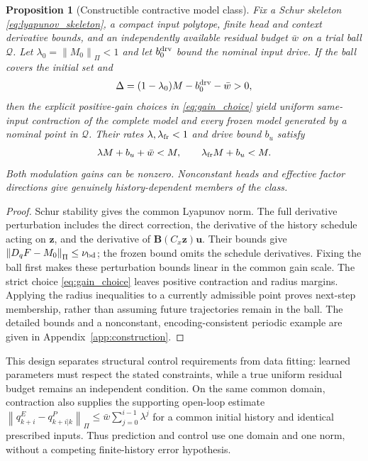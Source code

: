 \documentclass[journal]{IEEEtran}
\newtheorem{proposition}{Proposition}
\newcommand{\vu}{\mathbf{u}}
\newcommand{\vz}{\mathbf{z}}
\newcommand{\mB}{\mathbf{B}}
\newcommand{\norm}[1]{\left\lVert #1\right\rVert}
\begin{document}
\begin{proposition}[Constructible contractive model class]
\label{prop:contractive_class}
Fix a Schur skeleton \eqref{eq:lyapunov_skeleton}, a compact input polytope, finite head and context derivative bounds, and an independently available residual budget $\bar w$ on a trial ball $\mathcal Q$. Let $\lambda_0=\norm{M_0}_\Pi<1$ and let $b_0^{\rm drv}$ bound the nominal input drive. If the ball covers the initial set and
\begin{equation}
\Delta=(1-\lambda_0)M-b_0^{\rm drv}-\bar w>0,
\label{eq:radius_margin}
\end{equation}
then the explicit positive-gain choices in \eqref{eq:gain_choice} yield uniform same-input contraction of the complete model and every frozen model generated by a nominal point in $\mathcal Q$. Their rates $\lambda,\lambda_{\rm fr}<1$ and drive bound $b_u$ satisfy
\begin{equation}
\lambda M+b_u+\bar w<M,\qquad \lambda_{\rm fr}M+b_u<M.
\label{eq:invariant_radius}
\end{equation}
Both modulation gains can be nonzero. Nonconstant heads and effective factor directions give genuinely history-dependent members of the class.
\end{proposition}
\begin{proof}
Schur stability gives the common Lyapunov norm. The full derivative perturbation includes the direct correction, the derivative of the history schedule acting on $\vz$, and the derivative of $\mB(C_x\vz)\vu$. Their bounds give $\norm{D_qF-M_0}_\Pi\le\nu_{\rm bd}$; the frozen bound omits the schedule derivatives. Fixing the ball first makes these perturbation bounds linear in the common gain scale. The strict choice \eqref{eq:gain_choice} leaves positive contraction and radius margins. Applying the radius inequalities to a currently admissible point proves next-step membership, rather than assuming future trajectories remain in the ball. The detailed bounds and a nonconstant, encoding-consistent periodic example are given in Appendix~\ref{app:construction}.
\end{proof}

This design separates structural control requirements from data fitting: learned parameters must respect the stated constraints, while a true uniform residual budget remains an independent condition. On the same common domain, contraction also supplies the supporting open-loop estimate $\norm{q_{k+i}^E-q_{k+i|k}^P}_\Pi\le\bar w\sum_{j=0}^{i-1}\lambda^j$ for a common initial history and identical prescribed inputs. Thus prediction and control use one domain and one norm, without a competing finite-history error hypothesis.
\end{document}
